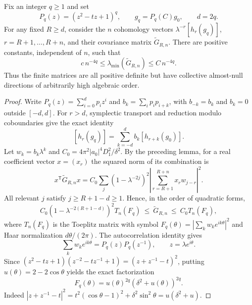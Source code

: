 \begin{theorem}
\label{thm:temporal-soft}
Fix an integer $q\ge1$ and set
\[
 P_q(z)=(z^2-tz+1)^q,\qquad g_q=P_q(C)g_0,\qquad d=2q.
\]
For any fixed $R\ge d$, consider the $n$ cohomology vectors
$\lambda^{-r}[h_r(g_q)]$, $r=R+1,\ldots,R+n$, and their covariance matrix
$\widetilde G_{R,n}$. There are positive constants, independent of $n$, such
that
\[
 c\,n^{-4q}\le\lambda_{\min}(\widetilde G_{R,n})\le C\,n^{-4q}.
\]
Thus the finite matrices are all positive definite but have collective
almost-null directions of arbitrarily high algebraic order.
\end{theorem}
\begin{proof}
Write $P_q(z)=\sum_{i=0}^dp_iz^i$ and
$b_k=\sum_i p_ip_{i+k}$, with $b_{-k}=b_k$ and $b_k=0$ outside $[-d,d]$.
For $r>d$, symplectic transport and reduction modulo coboundaries give the
exact identity
\[
 [h_r(g_q)]=\sum_{k=-d}^d b_k[h_{r+k}(g_0)].
\]
Let $w_k=b_k\lambda^k$ and
$C_0=4\pi^2|a_0|^4D_1^2/\delta^2$. By the preceding lemma, for a real
coefficient vector $x=(x_r)$ the squared norm of its combination is
\[
 x^{\mathsf T}\widetilde G_{R,n}x
 =C_0\sum_j(1-\lambda^{-2j})^2
            \left|\sum_{r=R+1}^{R+n}x_rw_{j-r}\right|^2.
\]
All relevant $j$ satisfy $j\ge R+1-d\ge1$. Hence, in the order of quadratic
forms,
\begin{equation}\label{eq:soft-sandwich}
 C_0(1-\lambda^{-2(R+1-d)})^2 T_n(F_q)
 \ \le\ \widetilde G_{R,n}\ \le\ C_0T_n(F_q),
\end{equation}
where $T_n(F_q)$ is the Toeplitz matrix with symbol
$F_q(\theta)=|\sum_kw_ke^{ik\theta}|^2$ and Haar normalization
$d\theta/(2\pi)$.
The autocorrelation identity gives
\[
 \sum_kw_ke^{ik\theta}=P_q(z)P_q(z^{-1}),\qquad z=\lambda e^{i\theta}.
\]
Since $(z^2-tz+1)(z^{-2}-tz^{-1}+1)=(z+z^{-1}-t)^2$, putting
$u(\theta)=2-2\cos\theta$ yields the exact factorization
\begin{equation}\label{eq:soft-symbol}
 \boxed{F_q(\theta)=u(\theta)^{2q}(\delta^2+u(\theta))^{2q}.}
\end{equation}
Indeed $|z+z^{-1}-t|^2=t^2(\cos\theta-1)^2+\delta^2\sin^2\theta
=u(\delta^2+u)$.


\end{proof}

